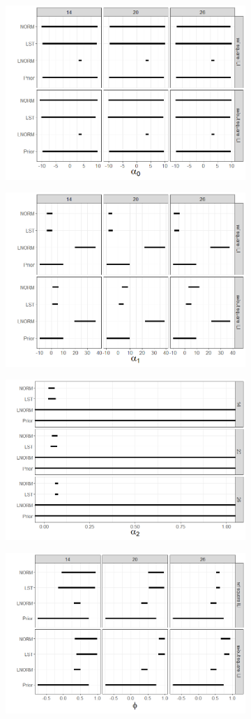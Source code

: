 \documentclass[ba]{imsart}
\theoremstyle{plain}
\theoremstyle{definition}
\theoremstyle{remark}
\begin{document}
\begin{supplement}
\begin{figure}[hbt!]
\centering
\begin{subfigure}
  \centering
  \includegraphics[width=.49\linewidth]{Images/alpha0_post.png}
\end{subfigure}%
\begin{subfigure}
  \centering
  \includegraphics[width=.49\linewidth]{Images/alpha1_post.png}
\end{subfigure}
\begin{subfigure}
  \centering
  \includegraphics[width=.49\linewidth]{Images/alpha2_post.png}
\end{subfigure}%
\begin{subfigure}
  \centering
  \includegraphics[width=.49\linewidth]{Images/phi_post.png}

\end{subfigure}
\end{figure}
\end{supplement}
\end{document}

